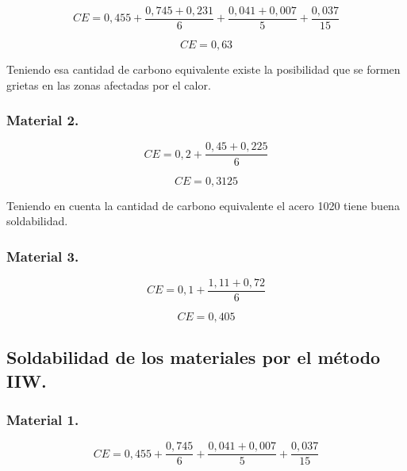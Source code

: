 \documentclass[12pt,a4paper]{article}
\begin{document}
\begin{equation*}
    CE = 0,455 + \frac{0,745 + 0,231}{6} + \frac{0,041 + 0,007}{5} + \frac{0,037}{15}
\end{equation*}

\begin{equation*}
    CE = 0,63
\end{equation*}

Teniendo esa cantidad de carbono equivalente existe la posibilidad que se formen grietas en las zonas afectadas por el calor.

\subsubsection{Material 2.}

\begin{equation*}
    CE = 0,2 + \frac{0,45 + 0,225}{6} 
\end{equation*}

\begin{equation*}
    CE = 0,3125
\end{equation*}

Teniendo en cuenta la cantidad de carbono equivalente el acero 1020 tiene buena soldabilidad.

\subsubsection{Material 3.}

\begin{equation*}
    CE = 0,1 + \frac{1,11 + 0,72}{6} 
\end{equation*}

\begin{equation*}
    CE = 0,405
\end{equation*}

\subsection{Soldabilidad de los materiales por el método IIW.}

\subsubsection{Material 1.}

\begin{equation*}
    CE = 0,455 + \frac{0,745}{6} + \frac{0,041 + 0,007}{5} + \frac{0,037}{15}
\end{equation*}
\end{document}
